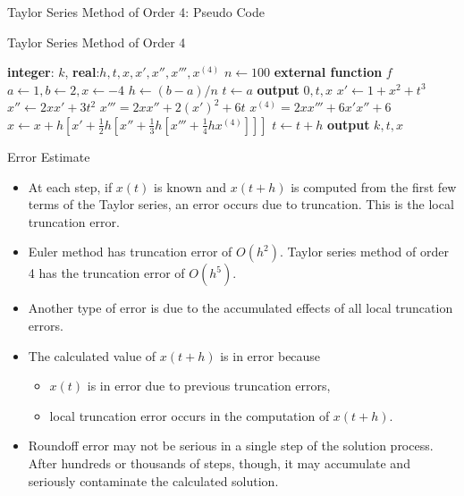 \documentclass{beamer}
\newcommand{\beforeverb}{\footnotesize}
\newcommand{\afterverb}{\normalsize}
\begin{document}
\begin{frame}{Taylor Series Method of Order 4: Pseudo Code}
\beforeverb
\begin{block}{Taylor Series Method of Order 4}
\begin{algorithmic}[1]
\State \textbf{integer}: $k$, \textbf{real}:$h, t, x, x', x'', x''', x^{(4)}$
\State $n\gets 100$
\State \textbf{external function} $f$
\State $a\gets 1, b  \gets 2, x\gets -4$
\State $h\gets  (b-a)/n$
\State $t\gets a $
\State \textbf{output} $0,t,x$
\State $x' \gets 1+x^2+t^3$
\State $x'' \gets 2xx'+3t^2$
\State $x'''=2xx''+2(x')^2+6t$
\State $x^{(4)}= 2xx'''+6x'x''+6$
\State $x\gets x+h\left[x'+\frac{1}{2}h\left[x''+\frac{1}{3}h\left[x'''+\frac{1}{4}hx^{(4)}\right]\right]\right]$
\State $t\gets t+h$
\State \textbf{output} $k,t,x$
\EndFor
\end{algorithmic}
\end{block}
\afterverb

\end{frame}
\begin{frame}{Error Estimate}
\begin{itemize}

\item At each step, if $x(t)$ is known and $x(t +h)$ is computed from the first few terms of the Taylor series, an error occurs due to truncation. This is the \alert{local truncation error}.
 \item Euler method has truncation error of $O(h^2)$. Taylor series method of order 4 has  the truncation error of $O(h^5)$.
\item Another type of error is due to the \alert{accumulated effects} of all local truncation errors. 
\item The calculated value of $x(t + h)$ is in error because 
\begin{itemize} 
\item $x(t)$ is in error due to \alert{previous truncation errors},
\item \alert{local truncation error} occurs in the computation of $x(t + h)$.
\end{itemize} 

\item Roundoff error may not be serious in \alert{a single step} of the solution process. After hundreds or thousands of steps, though, it may accumulate and seriously contaminate the calculated solution.
 
\end{itemize}
\end{frame}
\end{document}
